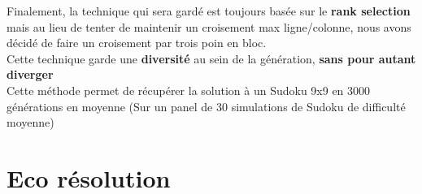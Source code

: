         Finalement, la technique qui sera gardé est toujours basée sur le \textbf{rank selection} mais au lieu de tenter de maintenir un croisement max ligne/colonne, nous avons décidé de faire un croisement par trois poin en bloc.\\
        Cette technique garde une \textbf{diversité} au sein de la génération, \textbf{sans pour autant diverger}\\
        Cette méthode permet de récupérer la solution à un Sudoku 9x9 en 3000 générations en moyenne (Sur un panel de 30 simulations de Sudoku de difficulté moyenne)

    \section{Eco résolution}
